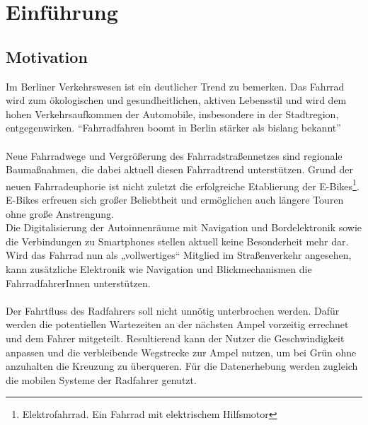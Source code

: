 \chapter{Einführung}
\section{Motivation}
Im Berliner Verkehrswesen ist ein deutlicher Trend zu bemerken. Das Fahrrad wird zum ökologischen und gesundheitlichen, aktiven Lebensstil und wird dem hohen Verkehrsaufkommen der Automobile, insbesondere in der Stadtregion, entgegenwirken. “Fahrradfahren boomt in Berlin stärker als bislang bekannt”\cite{Mopo}\\\\
Neue Fahrradwege und Vergrößerung des Fahrradstraßennetzes sind regionale Baumaßnahmen, die dabei aktuell diesen Fahrradtrend unterstützen. Grund der neuen Fahrradeuphorie ist nicht zuletzt die erfolgreiche Etablierung der E-Bikes\footnote{ Elektrofahrrad. Ein Fahrrad mit elektrischem Hilfsmotor}. 
E-Bikes erfreuen sich großer Beliebtheit und ermöglichen auch längere Touren ohne große Anstrengung.\\ 
Die Digitalisierung der Autoinnenräume mit Navigation und Bordelektronik sowie die Verbindungen zu Smartphones stellen aktuell keine Besonderheit mehr dar. Wird das Fahrrad nun als „vollwertiges“ Mitglied im Straßenverkehr angesehen, kann zusätzliche Elektronik wie Navigation und Blickmechanismen die FahrradfahrerInnen unterstützen.\\\\ 
Der Fahrtfluss des Radfahrers soll nicht unnötig unterbrochen werden. Dafür werden die potentiellen Wartezeiten an der nächsten Ampel vorzeitig errechnet und dem Fahrer mitgeteilt. Resultierend kann der Nutzer die Geschwindigkeit anpassen und die verbleibende Wegstrecke zur Ampel nutzen, um bei Grün ohne anzuhalten die Kreuzung zu überqueren. Für die Datenerhebung werden zugleich die mobilen Systeme der Radfahrer genutzt.
